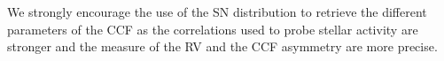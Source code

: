 \documentclass{aa}
\begin{document}
{We strongly encourage the use of the SN distribution to retrieve the different parameters of the CCF as the correlations used to probe stellar activity are stronger and the measure of the RV and the CCF asymmetry are more precise.
}
%

\end{document}
